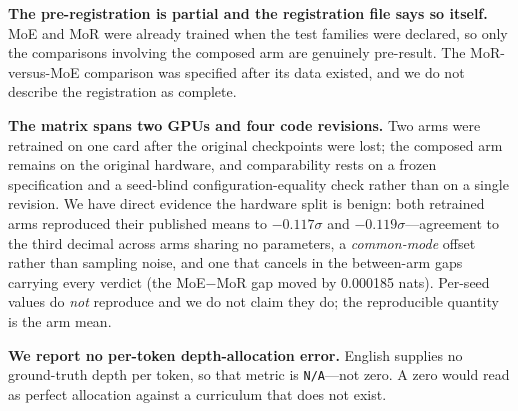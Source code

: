 \textbf{The pre-registration is partial and the registration file says so itself.}
MoE and MoR were already trained when the test families were declared, so only the
comparisons involving the composed arm are genuinely pre-result. The MoR-versus-MoE
comparison was specified after its data existed, and we do not describe the
registration as complete.

\textbf{The matrix spans two GPUs and four code revisions.} Two arms were
retrained on one card after the original checkpoints were lost; the composed arm
remains on the original hardware, and comparability rests on a frozen
specification and a seed-blind configuration-equality check rather than on a
single revision. We have direct evidence the hardware split is benign: both
retrained arms reproduced their published means to $-0.117\sigma$ and
$-0.119\sigma$---agreement to the third decimal across arms sharing no
parameters, a \emph{common-mode} offset rather than sampling noise, and one that
cancels in the between-arm gaps carrying every verdict (the MoE$-$MoR gap moved
by 0.000185 nats). Per-seed values do \emph{not} reproduce and we do not claim
they do; the reproducible quantity is the arm mean.

\textbf{We report no per-token depth-allocation error.} English supplies no
ground-truth depth per token, so that metric is \texttt{N/A}---not zero. A zero
would read as perfect allocation against a curriculum that does not exist.
